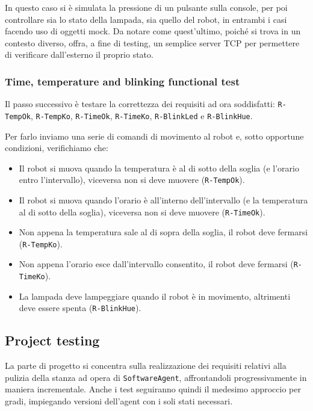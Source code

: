 \documentclass{../llncs}
\newcommand{\code}[1]{{\color{blue}\small{\texttt{#1}}}}
\newcommand{\labelsssec}[1]{\label{sssec:#1}}
\begin{document}


In questo caso si è simulata la pressione di un pulsante sulla console, per poi controllare sia lo stato della lampada, sia quello del robot, in entrambi i casi facendo uso di oggetti mock. Da notare come quest'ultimo, poiché si trova in un contesto diverso, offra, a fine di testing, un semplice server TCP per permettere di verificare dall'esterno il proprio stato.

\subsubsection{Time, temperature and blinking functional test}
\labelsssec{timeTempBlinkFTest}
Il passo successivo è testare la correttezza dei requisiti ad ora soddisfatti: \code{R-TempOk}, \code{R-TempKo}, \code{R-TimeOk}, \code{R-TimeKo}, \code{R-BlinkLed} e \code{R-BlinkHue}.

Per farlo inviamo una serie di comandi di movimento al robot e, sotto opportune condizioni, verifichiamo che:
\begin{itemize}
\item Il robot si muova quando la temperatura è al di sotto della soglia (e l'orario entro l'intervallo), viceversa non si deve muovere (\code{R-TempOk}).
\item Il robot si muova quando l'orario è all'interno dell'intervallo (e la temperatura al di sotto della soglia), viceversa non si deve muovere (\code{R-TimeOk}).
\item Non appena la temperatura sale al di sopra della soglia, il robot deve fermarsi (\code{R-TempKo}).
\item Non appena l'orario esce dall'intervallo consentito, il robot deve fermarsi (\code{R-TimeKo}).
\item La lampada deve lampeggiare quando il robot è in movimento, altrimenti deve essere spenta (\code{R-BlinkHue}).
\end{itemize}



\subsection{Project testing}
La parte di progetto si concentra sulla realizzazione dei requisiti relativi alla pulizia della stanza ad opera di \texttt{SoftwareAgent}, affrontandoli progressivamente in maniera incrementale. Anche i test seguiranno quindi il medesimo approccio per gradi, impiegando versioni dell'agent con i soli stati necessari.
\end{document}
